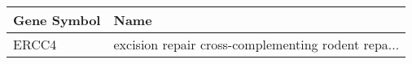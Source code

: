 \begin{tabular}{ll}
\toprule
Gene Symbol &                                               Name \\
\midrule
      ERCC4 & excision repair cross-complementing rodent repa... \\
\bottomrule
\end{tabular}
